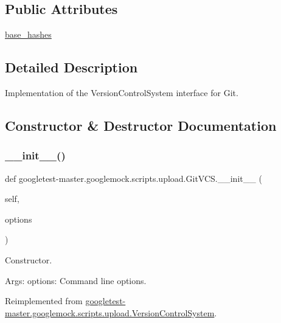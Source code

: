 \subsection*{Public Attributes}
\begin{DoxyCompactItemize}
\item 
\mbox{\hyperlink{classgoogletest-master_1_1googlemock_1_1scripts_1_1upload_1_1_git_v_c_s_a6480bbb7667540b6f83b69616fb00b78}{base\+\_\+hashes}}
\end{DoxyCompactItemize}


\subsection{Detailed Description}
\begin{DoxyVerb}Implementation of the VersionControlSystem interface for Git.\end{DoxyVerb}
 

\subsection{Constructor \& Destructor Documentation}
\mbox{\label{classgoogletest-master_1_1googlemock_1_1scripts_1_1upload_1_1_git_v_c_s_a432bf6bdc09ac36b3fc46320e4762167}} 
\subsubsection{\texorpdfstring{\_\_init\_\_()}{\_\_init\_\_()}}
{\footnotesize\ttfamily def googletest-\/master.\+googlemock.\+scripts.\+upload.\+Git\+V\+C\+S.\+\_\+\+\_\+init\+\_\+\+\_\+ (\begin{DoxyParamCaption}\item[{}]{self,  }\item[{}]{options }\end{DoxyParamCaption})}

\begin{DoxyVerb}Constructor.

Args:
  options: Command line options.
\end{DoxyVerb}
 

Reimplemented from \mbox{\hyperlink{classgoogletest-master_1_1googlemock_1_1scripts_1_1upload_1_1_version_control_system_ac11abe4f52d562e0ad112ab345eda7eb}{googletest-\/master.\+googlemock.\+scripts.\+upload.\+Version\+Control\+System}}.



